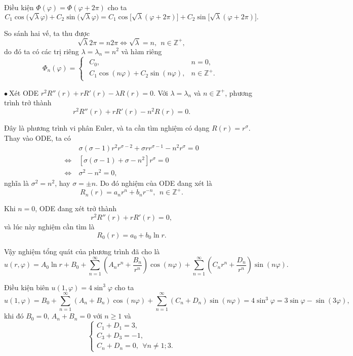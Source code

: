 \documentclass[10pt, a4paper]{article}
\begin{document}
	Điều kiện $\Phi(\varphi)=\Phi(\varphi+2\pi)$ cho ta $$C_1\cos\big(\sqrt\lambda\varphi\big)+C_2\sin\big(\sqrt\lambda\varphi\big)=C_1\cos\big[\sqrt\lambda(\varphi+2\pi)\big]+C_2\sin\big[\sqrt\lambda(\varphi+2\pi)\big].$$
	
	So sánh hai vế, ta thu được $$\sqrt\lambda2\pi=n2\pi\iff\sqrt\lambda=n,~~n\in\mathbb Z^+,$$
	do đó ta có các trị riêng $\lambda=\lambda_n=n^2$ và hàm riêng $$\Phi_n(\varphi)=\begin{cases}
		\begin{array}{ll}
			C_0, & n=0, \\
			C_1\cos(n\varphi)+C_2\sin(n\varphi), & n\in\mathbb Z^+.
		\end{array}
	\end{cases}$$
	
	$\bullet~$Xét ODE $r^2R''(r)+rR'(r)-\lambda R(r)=0.$ Với $\lambda=\lambda_n$ và $n\in\mathbb Z^+$, phương trình trở thành $$r^2R''(r)+rR'(r)-n^2R(r)=0.$$
	
	Đây là phương trình vi phân Euler, và ta cần tìm nghiệm có dạng $R(r)=r^\sigma$. Thay vào ODE, ta có \begin{align*}
		&\sigma(\sigma-1)r^2r^{\sigma-2}+\sigma rr^{\sigma-1}-n^2r^\sigma=0\\
		\Leftrightarrow~&[\sigma(\sigma-1)+\sigma-n^2]r^\sigma=0\\
		\Leftrightarrow~&\sigma^2-n^2=0,
	\end{align*}
	nghĩa là $\sigma^2=n^2$, hay $\sigma=\pm n$. Do đó nghiệm của ODE đang xét là $$R_n(r)=a_nr^n+b_nr^{-n},~~n\in\mathbb Z^+.$$
	
	Khi $n=0$, ODE đang xét trở thành $$r^2R''(r)+rR'(r)=0,$$
	và lúc này nghiệm cần tìm là $$R_0(r)=a_0+b_0\ln r.$$
	
	Vậy nghiệm tổng quát của phương trình đã cho là $$u(r,\varphi)=A_0\ln r+B_0+\displaystyle\sum_{n=1}^\infty\left(A_nr^n+\dfrac{B_n}{r^n}\right)\cos(n\varphi)+\displaystyle\sum_{n=1}^\infty\left(C_nr^n+\dfrac{D_n}{r^n}\right)\sin(n\varphi).$$
	
	Điều kiện biên $u(1,\varphi)=4\sin^3\varphi$ cho ta $$u(1,\varphi)=B_0+\displaystyle\sum_{n=1}^\infty\left(A_n+B_n\right)\cos(n\varphi)+\displaystyle\sum_{n=1}^\infty\left(C_n+D_n\right)\sin (n\varphi)=4\sin^3\varphi=3\sin\varphi-\sin(3\varphi),$$
	khi đó $B_0=0,\,A_n+B_n=0$ với $n\ge1$ và $$\begin{cases}
		C_1+D_1=3,\\
		C_3+D_3=-1,\\
		C_n+D_n=0,~~\forall n\ne1;3.
	\end{cases}$$
	
\end{document}
